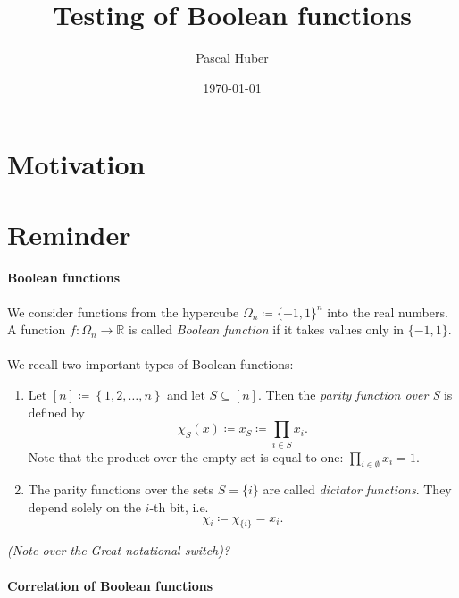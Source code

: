 \documentclass[a4paper]{article}
\newcommand{\real}{\mathbb{R}}
\newcommand{\nset}{[n]}
\theoremstyle{plain}
\theoremstyle{definition}
\theoremstyle{remark}
\begin{document}
\title{Testing of Boolean functions}
\author{Pascal Huber}
\date{\today}
\maketitle

\section{Motivation}
\label{sec:motivation}

\section{Reminder}
\label{sec:reminder}

\paragraph{Boolean functions}
\label{sec:boolean-functions}

We consider functions from the hypercube \(\Omega_n \coloneqq
\{-1,1\}^n\) into the real numbers. A function \(f: \Omega_n
\rightarrow \real\) is called \emph{Boolean function} if it takes values only in
\(\{-1,1\}\). \\\\
We recall two important types of Boolean functions:\\
\begin{enumerate}
\item Let \(\nset \coloneqq \left\{1,2, \dots, n\right\}\) and let
  \(S\subseteq \nset\). Then the \emph{parity function over S} is
  defined by 
  \[ \chi_S(x) \coloneqq x_S \coloneqq \prod_{i \in S} x_i. \]
  Note that the product over the empty set is equal to one: \(\prod_{i
    \in \emptyset} x_i = 1\). 

\item The parity functions over the sets \(S = \{i\}\) are called
  \emph{dictator functions}. They depend solely on the \(i\)-th bit,
  i.e. 
  \[\chi_i \coloneqq \chi_{\{i\}} = x_i.\] 
\end{enumerate}

\noindent\emph{(Note over the Great notational switch)?}
\\

\paragraph{Correlation of Boolean functions}
\label{sec:corr-bool-funct}
\end{document}
